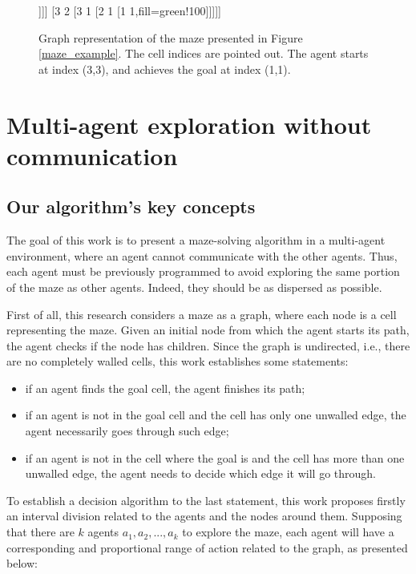 \begin{figure}[ht!]
\centering
\begin{forest}
 [3 3,for tree={circle,draw},s sep=12mm,fill=red!100
 	[2 3
 		[2 2
 			[1 2
 				[1 3]]]]
 	[3 2
 		[3 1
 			[2 1
 				[1 1,fill=green!100]]]]]
\end{forest}
\caption{Graph representation of the maze presented in Figure \ref{maze_example}. The cell indices are pointed out. The agent starts at index (3,3), and achieves the goal at index (1,1).}
\label{maze_example_graph}
\end{figure}



\section{Multi-agent exploration without communication}
\label{section_models_exploration}
\subsection{Our algorithm's key concepts}
\label{section_models_exploration_key_concepts}
The goal of this work is to present a maze-solving algorithm in a multi-agent environment, where an agent cannot communicate with the other agents. Thus, each agent must be previously programmed to avoid exploring the same portion of the maze as other agents. Indeed, they should be as dispersed as possible.

First of all, this research considers a maze as a graph, where each node is a cell representing the maze. Given an initial node from which the agent starts its path, the agent checks if the node has children. Since the graph is undirected, i.e., there are no completely walled cells, this work establishes some statements:

\begin{itemize}
\item if an agent finds the goal cell, the agent finishes its path;

\item if an agent is not in the goal cell and the cell has only one unwalled edge, the agent necessarily goes through such edge;

\item if an agent is not in the cell where the goal is and the cell has more than one unwalled edge, the agent needs to decide which edge it will go through.
\end{itemize}

To establish a decision algorithm to the last statement, this work proposes firstly an interval division related to the agents and the nodes around them. Supposing that there are $k$ agents $a_{1}, a_{2},...,a_{k}$ to explore the maze, each agent will have a corresponding and proportional range of action related to the graph, as presented below:

